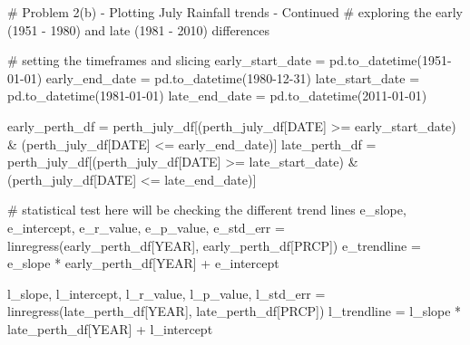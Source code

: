 \documentclass[
  letterpaper,
  DIV=11,
  numbers=noendperiod]{scrartcl}
\newenvironment{Shaded}{\begin{snugshade}}{\end{snugshade}}
\newcommand{\CommentTok}[1]{\textcolor[rgb]{0.37,0.37,0.37}{#1}}
\newcommand{\NormalTok}[1]{\textcolor[rgb]{0.00,0.23,0.31}{#1}}
\newcommand{\OperatorTok}[1]{\textcolor[rgb]{0.37,0.37,0.37}{#1}}
\newcommand{\StringTok}[1]{\textcolor[rgb]{0.13,0.47,0.30}{#1}}
\begin{document}
\begin{Shaded}
\begin{Highlighting}[]
\CommentTok{\# Problem 2(b) {-} Plotting July Rainfall trends {-} Continued}
\CommentTok{\# exploring the early (1951 {-} 1980) and late (1981 {-} 2010) differences}

\CommentTok{\# setting the timeframes and slicing}
\NormalTok{early\_start\_date }\OperatorTok{=}\NormalTok{ pd.to\_datetime(}\StringTok{\textquotesingle{}1951{-}01{-}01\textquotesingle{}}\NormalTok{)}
\NormalTok{early\_end\_date }\OperatorTok{=}\NormalTok{ pd.to\_datetime(}\StringTok{\textquotesingle{}1980{-}12{-}31\textquotesingle{}}\NormalTok{)}
\NormalTok{late\_start\_date }\OperatorTok{=}\NormalTok{ pd.to\_datetime(}\StringTok{\textquotesingle{}1981{-}01{-}01\textquotesingle{}}\NormalTok{)}
\NormalTok{late\_end\_date }\OperatorTok{=}\NormalTok{ pd.to\_datetime(}\StringTok{\textquotesingle{}2011{-}01{-}01\textquotesingle{}}\NormalTok{)}

\NormalTok{early\_perth\_df }\OperatorTok{=}\NormalTok{ perth\_july\_df[(perth\_july\_df[}\StringTok{\textquotesingle{}DATE\textquotesingle{}}\NormalTok{] }\OperatorTok{\textgreater{}=}\NormalTok{ early\_start\_date) }\OperatorTok{\&}\NormalTok{ (perth\_july\_df[}\StringTok{\textquotesingle{}DATE\textquotesingle{}}\NormalTok{] }\OperatorTok{\textless{}=}\NormalTok{ early\_end\_date)]}
\NormalTok{late\_perth\_df }\OperatorTok{=}\NormalTok{ perth\_july\_df[(perth\_july\_df[}\StringTok{\textquotesingle{}DATE\textquotesingle{}}\NormalTok{] }\OperatorTok{\textgreater{}=}\NormalTok{ late\_start\_date) }\OperatorTok{\&}\NormalTok{ (perth\_july\_df[}\StringTok{\textquotesingle{}DATE\textquotesingle{}}\NormalTok{] }\OperatorTok{\textless{}=}\NormalTok{ late\_end\_date)]}

\CommentTok{\# statistical test here will be checking the different trend lines}
\NormalTok{e\_slope, e\_intercept, e\_r\_value, e\_p\_value, e\_std\_err }\OperatorTok{=}\NormalTok{ linregress(early\_perth\_df[}\StringTok{\textquotesingle{}YEAR\textquotesingle{}}\NormalTok{], early\_perth\_df[}\StringTok{\textquotesingle{}PRCP\textquotesingle{}}\NormalTok{])}
\NormalTok{e\_trendline }\OperatorTok{=}\NormalTok{ e\_slope }\OperatorTok{*}\NormalTok{ early\_perth\_df[}\StringTok{\textquotesingle{}YEAR\textquotesingle{}}\NormalTok{] }\OperatorTok{+}\NormalTok{ e\_intercept}

\NormalTok{l\_slope, l\_intercept, l\_r\_value, l\_p\_value, l\_std\_err }\OperatorTok{=}\NormalTok{ linregress(late\_perth\_df[}\StringTok{\textquotesingle{}YEAR\textquotesingle{}}\NormalTok{], late\_perth\_df[}\StringTok{\textquotesingle{}PRCP\textquotesingle{}}\NormalTok{])}
\NormalTok{l\_trendline }\OperatorTok{=}\NormalTok{ l\_slope }\OperatorTok{*}\NormalTok{ late\_perth\_df[}\StringTok{\textquotesingle{}YEAR\textquotesingle{}}\NormalTok{] }\OperatorTok{+}\NormalTok{ l\_intercept}


\end{Highlighting}
\end{Shaded}
\end{document}

